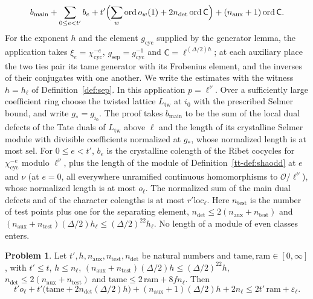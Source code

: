 \documentclass[reqno]{amsart}
\theoremstyle{definition}
\newtheorem{problem}{Problem}[section]
\theoremstyle{plain}
\newcommand{\Oc}{\mathcal{O}}
\newcommand{\ord}{\operatorname{ord}}
\newcommand{\cyc}{\chi_{\mathrm{cyc}}}
\newcommand{\loc}{\mathrm{loc}}
\newcommand{\half}{(\Delta/2)}
\begin{document}
\[
  b_{\mathrm{main}} + \sum_{0 \le e < t'} b_e + t'\Bigl(\sum_w \ord o_w(1) + 2n_{\mathrm{det}} \ord \mathsf C\Bigr) + (n_{\mathrm{aux}} + 1)\ord \mathsf C .
\]
For the exponent \(h\) and the element \(g_{\mathrm{cyc}}\) supplied by the generator lemma, the application takes \(\xi_e = \cyc^{-e}\), \(g_{\mathrm{sep}} = g_{\mathrm{cyc}}^{-1}\) and \(\mathsf C = \ell^{\half h}\); at each auxiliary place the two ties pair its tame generator with its Frobenius element, and the inverses of their conjugates with one another.  We write the estimates with the witness \(h = h_\ell\) of Definition~\ref{def:sep}.  In this application \(p = \ell^\nu\).  Over a sufficiently large coefficient ring choose the twisted lattice \(L_{\mathrm{tw}}\) at \(i_0\) with the prescribed Selmer bound, and write \(g_* = g_{i_0}\).  The proof takes \(b_{\mathrm{main}}\) to be the sum of the local dual defects of the Tate duals of \(L_{\mathrm{tw}}\) above \(\ell\) and the length of its crystalline Selmer module with divisible coefficients normalized at \(g_*\), whose normalized length is at most \(\mathrm{sel}\).  For \(0 \le e < t'\), \(b_e\) is the crystalline colength of the Ribet cocycles for \(\cyc^{-e}\) modulo \(\ell^\nu\), plus the length of the module of Definition~\ref{tt-def:shaodd} at \(e\) and \(\nu\) (at \(e = 0\), all everywhere unramified continuous homomorphisms to \(\Oc/\ell^\nu\)), whose normalized length is at most \(o_\ell\).  The normalized sum of the main dual defects and of the character colengths is at most \(r'\loc_\ell\).  Here \(n_{\mathrm{test}}\) is the number of test points plus one for the separating element, \(n_{\mathrm{det}} \le 2(n_{\mathrm{aux}} + n_{\mathrm{test}})\) and \((n_{\mathrm{aux}} + n_{\mathrm{test}})\half h_\ell \le \half^{22}h_\ell\).  No length of a module of even classes enters.

\begin{problem}\label{pr:arith}
Let \(t', h, n_{\mathrm{aux}}, n_{\mathrm{test}}, n_{\mathrm{det}}\) be natural numbers and \(\mathrm{tame}, \mathrm{ram} \in [0, \infty]\), with \(t' \le t\), \(h \le n_\ell\), \((n_{\mathrm{aux}} + n_{\mathrm{test}})\half h \le \half^{22}h\), \(n_{\mathrm{det}} \le 2(n_{\mathrm{aux}} + n_{\mathrm{test}})\) and \(\mathrm{tame} \le 2\,\mathrm{ram} + 8fn_\ell\).  Then
\[
  t'o_\ell + t'\bigl(\mathrm{tame} + 2n_{\mathrm{det}}\half h\bigr) + (n_{\mathrm{aux}} + 1)\half h + 2n_\ell \le 2t'\,\mathrm{ram} + \varepsilon_\ell .
\]
\end{problem}
\end{document}
